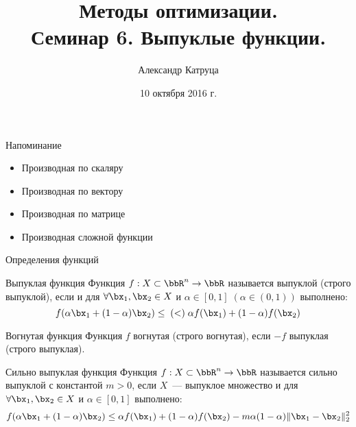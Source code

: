 \documentclass[12pt,russian]{beamer}
\title[Семинар 6]{Методы оптимизации. \\
 Семинар 6. Выпуклые функции.}
\author{Александр Катруца}
\institute{Московский физико-технический институт,\\
Факультет Управления и Прикладной Математики}
\date{10 октября 2016 г.}
\begin{document}
\begin{frame}
\maketitle
\end{frame}

\begin{frame}{Напоминание}
\begin{itemize}
\item Производная по скаляру
\item Производная по вектору
\item Производная по матрице
\item Производная сложной функции
\end{itemize}
\end{frame}

\begin{frame}{Определения функций}
\small
\begin{block}{Выпуклая функция}
Функция $f: X \subset \bbR^n \rightarrow \bbR$ называется выпуклой (строго выпуклой), если {\color{red}{$X$~--- выпуклое множество}} и для $\forall \bx_1, \bx_2 \in X$ и $\alpha \in [0, 1] \; (\alpha \in (0, 1))$  выполнено:
\vspace{-4mm}
\[
f(\alpha \bx_1 + (1 - \alpha)\bx_2) \leq \; (<) \; \alpha f(\bx_1) + (1 - \alpha)f(\bx_2)
\]
\end{block}

\begin{block}{Вогнутая функция}
Функция $f$ вогнутая (строго вогнутая), если $-f$ выпуклая (строго выпуклая).
\end{block}

\begin{block}{Сильно выпуклая функция}
Функция $f: X \subset \bbR^n \rightarrow \bbR$ называется сильно  выпуклой с константой $m > 0$, если $X$~--- выпуклое множество и для $\forall \bx_1, \bx_2 \in X$ и $\alpha \in [0, 1]$  выполнено:
\vspace{-4mm}
\[
f(\alpha \bx_1 + (1 - \alpha)\bx_2) \leq \alpha f(\bx_1) + (1 - \alpha)f(\bx_2) - m \alpha (1 - \alpha) \| \bx_1 - \bx_2 \|_2^2
\]
\end{block}

\end{frame}
\end{document}
